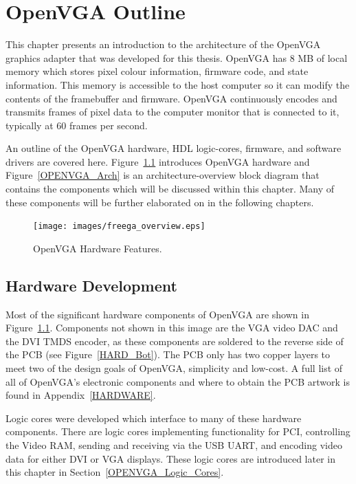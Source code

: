\chapter{OpenVGA Outline}
\label{OPENVGA}

This chapter presents an introduction to the architecture of the OpenVGA graphics
adapter that was developed for this thesis. OpenVGA has 8 MB of local memory
which stores pixel colour information, firmware code, and state information. This
memory is accessible to the host computer so it can modify the contents of the
framebuffer and firmware. OpenVGA continuously encodes and transmits frames of
pixel data to the computer monitor that is connected to it, typically at 60
frames per second.

An outline of the OpenVGA hardware, HDL logic-cores, firmware, and software
drivers are covered here. Figure~\ref{OPENVGA_OpenVGA} introduces OpenVGA
hardware and Figure~\ref{OPENVGA_Arch} is an architecture-overview block diagram
that contains the components which will be discussed within this chapter. Many of
these components will be further elaborated on in the following chapters.

\begin{figure}[h!]
\begin{center}
\texttt{[image: images/freega\_overview.eps]}
\caption[OpenVGA Hardware Features]{OpenVGA Hardware Features.}
\label{OPENVGA_OpenVGA}
\end{center}
\end{figure}


\section{Hardware Development}
\label{OPENVGA_Hardware}

Most of the significant hardware components of OpenVGA are shown in
Figure~\ref{OPENVGA_OpenVGA}. Components not shown in this image are the VGA
video DAC and
the DVI TMDS encoder, as these components are soldered to the reverse side of the
PCB (see Figure~\ref{HARD_Bot}). The PCB only has two copper layers to meet two
of the design goals of OpenVGA, simplicity and low-cost. A full list of all of
OpenVGA's electronic components and where to obtain the PCB artwork is found in
Appendix~\ref{HARDWARE}.

Logic cores were developed which interface to many of these hardware components.
There are logic cores implementing functionality for PCI, controlling the Video
RAM, sending and receiving via the USB UART, and encoding video data for either
DVI or VGA displays. These logic cores are introduced later in this chapter in
Section~\ref{OPENVGA_Logic_Cores}.

